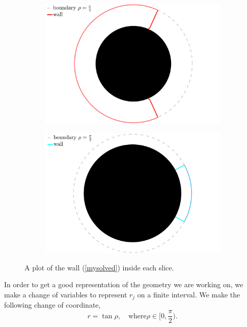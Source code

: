 \begin{figure}
    \centering
    \begin{subfigure}[b]{0.45\textwidth}
        \centering
        \includegraphics[width=\textwidth]{figures/wall_red.png}
        \label{wall_red}
    \end{subfigure}
    \hfill
    \begin{subfigure}[b]{0.45\textwidth}
        \centering
        \includegraphics[width=\textwidth]{figures/wall_blue.png}
        \label{wall_blue}
    \end{subfigure}
    \caption{A plot of the wall (\ref{mysolved}) inside each slice.}
    \label{slicegeodesic}
\end{figure}


In order to get a good representation of the geometry we are working on, we make a change of variables to represent $r_j$ on a finite interval. We make the following change of coordinate,
\begin{equation}
    r=\tan{\rho}, \quad \text{where} \rho \in [0,\frac{\pi}{2}).
\end{equation}

